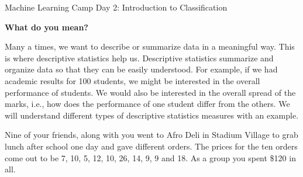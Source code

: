 \documentclass[10pt]{article}
\newcommand{\headerclass}{Machine Learning Camp}
\newcommand{\headersection}{Day 2: Introduction to Classification}
\newcommand{\headertitle}{What do you mean?}
\begin{document}
\headerclass\xspace {} \headersection\\
\begin{center}{ \large \textbf{\headertitle} }\end{center}

Many a times, we want to describe or summarize data in a meaningful way. This is where descriptive statistics help us. Descriptive statistics summarize and organize data so that they can be easily understood. For example, if we had academic results for 100 students, we might be interested in the overall performance of students. We would also be interested in the overall spread of the marks, i.e., how does the performance of one student differ from the others. We will understand different types of descriptive statistics measures with an example.

\vspace{0.5cm}
Nine of your friends, along with you went to Afro Deli in Stadium Village to grab lunch after school one day and gave different orders. The prices for the ten orders come out to be 7, 10, 5, 12, 10, 26, 14, 9, 9 and 18. As a group you spent \$120 in all.
\end{document}
